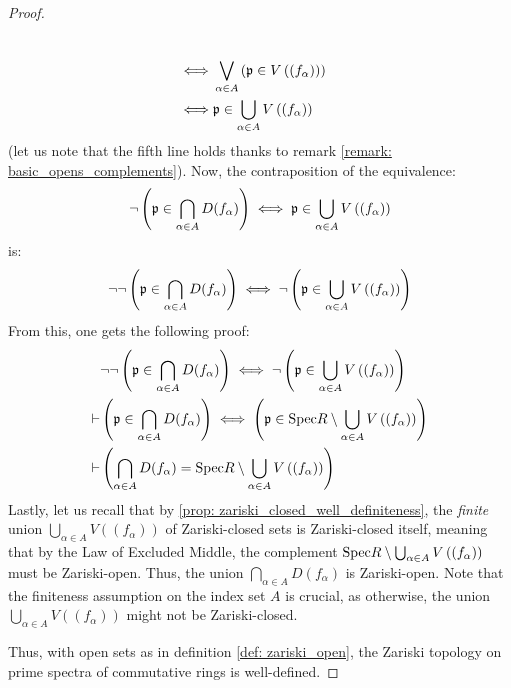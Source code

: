 \begin{proof}
\begin{enumerate}
$$\begin{aligned}
                                            \\
                                            \iff & \bigvee_{\alpha \in A} \left(\mathfrak{p} \in V\left((f_{\alpha})\right)\right)
                                            \\
                                            \iff & \mathfrak{p} \in \bigcup_{\alpha \in A} V\left((f_{\alpha})\right)
                                        \end{aligned}
                                    $$
                                (let us note that the fifth line holds thanks to remark \ref{remark: basic_opens_complements}). Now, the contraposition of the equivalence:
                                    $$\neg \left(\mathfrak{p} \in \bigcap_{\alpha \in A} D(f_{\alpha})\right) \iff \mathfrak{p} \in \bigcup_{\alpha \in A} V\left((f_{\alpha})\right)$$
                                is:
                                    $$\neg \neg \left(\mathfrak{p} \in \bigcap_{\alpha \in A} D(f_{\alpha})\right) \iff \neg \left(\mathfrak{p} \in \bigcup_{\alpha \in A} V\left((f_{\alpha})\right) \right)$$
                                From this, one gets the following proof:
                                    $$
                                        \begin{aligned}
                                            & \neg \neg \left(\mathfrak{p} \in \bigcap_{\alpha \in A} D(f_{\alpha})\right) \iff \neg \left(\mathfrak{p} \in \bigcup_{\alpha \in A} V\left((f_{\alpha})\right) \right)
                                            \\
                                            \vdash & \left(\mathfrak{p} \in \bigcap_{\alpha \in A} D(f_{\alpha})\right) \iff \left(\mathfrak{p} \in \mathrm{Spec} R \setminus \bigcup_{\alpha \in A} V\left((f_{\alpha})\right) \right) 
                                            \\
                                            \vdash & \left(\bigcap_{\alpha \in A} D(f_{\alpha}) = \mathrm{Spec} R \setminus \bigcup_{\alpha \in A} V\left((f_{\alpha})\right)\right)
                                        \end{aligned}
                                    $$
                                Lastly, let us recall that by \ref{prop: zariski_closed_well_definiteness}, the \textit{finite} union $\bigcup_{\alpha \in A} V\left((f_{\alpha})\right)$ of Zariski-closed sets is Zariski-closed itself, meaning that by the Law of Excluded Middle, the complement $\mathrm{Spec} R \setminus \bigcup_{\alpha \in A} V\left((f_{\alpha})\right)$ must be Zariski-open. Thus, the union $\bigcap_{\alpha \in A} D(f_{\alpha})$ is Zariski-open. Note that the finiteness assumption on the index set $A$ is crucial, as otherwise, the union $\bigcup_{\alpha \in A} V\left((f_{\alpha})\right)$ might not be Zariski-closed.
                            \end{enumerate}
                        Thus, with open sets as in definition \ref{def: zariski_open}, the Zariski topology on prime spectra of commutative rings is well-defined.
                    \end{proof}
                
